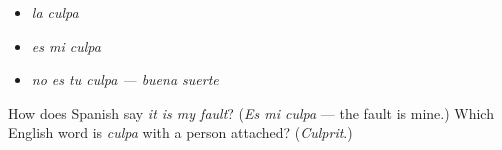 \begin{itemize}
\raggedright
  \item \emph{la culpa}
  \item \emph{es mi culpa}
  \item \emph{no es tu culpa — buena suerte}
\end{itemize}

\begin{tcolorbox}[breakable,colback=teal!4,colframe=teal!35!black,title={Before you move on}]
How does Spanish say \emph{it is my fault}? (\emph{Es mi culpa} — the fault is mine.) Which English word is \emph{culpa} with a person attached? (\emph{Culprit}.)
\end{tcolorbox}
